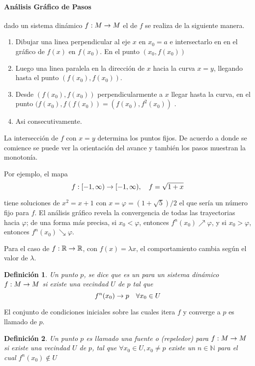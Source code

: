 \documentclass[12pt]{book}
\newcommand{\R}{\ensuremath{\mathbb{R}} }
\newcommand{\N}{\mathbb{N}}
\newtheorem{mydef}{Definición}
\begin{document}
\newcommand{\map}{\ensuremath{f: M \ra M} }
\paragraph{Análisis Gráfico de Pasos} dado un sistema dinámico \map el  de $f$ se realiza de la siguiente manera.
\begin{enumerate}
	\item Dibujar una linea perpendicular al eje $x$ en $x_0 = a$ e
intersectarlo en en el gráfico de $f(x)$ en $f(x_0)$. En el punto $(x_0,
f(x_0))$
	\item Luego una linea paralela en la dirección de $x$ hacia la curva
$x=y$, llegando hasta el punto $(f(x_0), f(x_0))$.
	\item Desde $(f(x_0), f(x_0))$ perpendicularmente a $x$ llegar hasta la
curva, en el punto $(f(x_0), f(f(x_0)) = (f(x_0), f^2(x_0))$ .
	\item Asi consecutivamente.
\end{enumerate}
La intersección de $f$ con $x=y$ determina los puntos fijos.
De acuerdo a donde se comience se puede ver la orientación del avance y también
los pasos muestran la monotonía.

Por ejemplo, el mapa 
$$
	f: [-1, \infty) \rightarrow [-1, \infty), \quad f=\sqrt{1 + x} 
$$

tiene soluciones de $x^2 = x + 1$ con $x = \varphi = (1 + \sqrt{5})/2$ el
que sería un número fijo para $f$.  El análisis gráfico revela la convergencia
de todas las trayectorias hacia $\varphi$; de una forma más precisa, si $x_0 <
\varphi$, entonces $f^n(x_0) \nearrow \varphi$, y si $x_0 > \varphi$, entonces
$f^n(x_0) \searrow \varphi$.


Para el caso de $f: \R \ra \R$, con $f(x) = \lambda x$, el comportamiento cambia
según el valor de $\lambda$.

\begin{mydef}
Un punto $p$, se dice que es un  para un sistema dinámico \map si
existe una vecindad $U$ de $p$ tal que
$$
	f^n(x_0) \rightarrow p \quad \forall x_0 \in U
$$ 
\end{mydef}

El conjunto de condiciones iniciales sobre las cuales itera $f$ y converge a $p$
es llamado  de $p$.

\begin{mydef}
Un punto $p$ es llamado una fuente o (repeledor) para \map si existe una
vecindad $U$ de $p$, tal que $\forall x_0 \in U, x_0 \not = p$ existe un $n \in
\N$ para el cual $f^n(x_0) \not \in U$
\end{mydef} 
\end{document}
